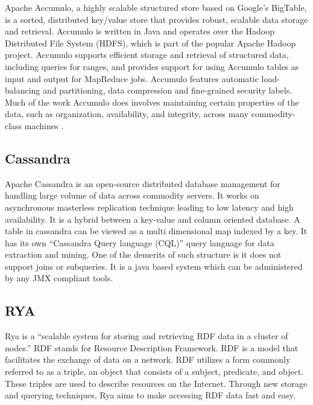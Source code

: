     Apache Accumulo, a highly scalable structured store based on
     Google’s BigTable, is a sorted, distributed key/value store that
     provides robust, scalable data storage and retrieval. Accumulo is
     written in Java and operates over the Hadoop Distributed File
     System (HDFS), which is part of the popular Apache Hadoop
     project. Accumulo supports efficient storage and retrieval of
     structured data, including queries for ranges, and provides
     support for using Accumulo tables as input and output for
     MapReduce jobs.
     Accumulo features automatic load-balancing and
     partitioning, data compression and fine-grained security
     labels. Much of the work Accumulo does involves maintaining
     certain properties of the data, such as organization,
     availability, and integrity, across many commodity-class
     machines \cite{apache-accumulo}.

\subsection{ Cassandra}

     Apache Cassandra \cite{www-cassandra} is an open-source
     distributed database management for handling large volume of
     data across commodity servers. It works on asynchronous
     masterless replication technique leading to low latency and high
     availability. It is a hybrid between a key-value and column
     oriented database. A table in cassandra can be viewed as a multi
     dimensional map indexed by a key. It has its own ``Cassandra Query
     language (CQL)'' query language for data extraction and
     mining. One of the demerits of such structure is it does not
     support joins or subqueries. It is a java based system which can
     be administered by any JMX compliant tools.

\subsection{ RYA}

     Rya is a ``scalable system for storing and retrieving RDF data in
     a cluster of nodes.'' \cite{Punnoose} RDF stands for Resource
     Description Framework. \cite{Punnoose} RDF is a model that
     facilitates the exchange of data on a network. \cite{w3} RDF
     utilizes a form commonly referred to as a triple, an object that
     consists of a subject, predicate, and object. \cite{Punnoose}
     These triples are used to describe resources on the
     Internet. \cite{Punnoose} Through new storage and querying
     techniques, Rya aims to make accessing RDF data fast and
     easy. \cite{apacherya}
     
